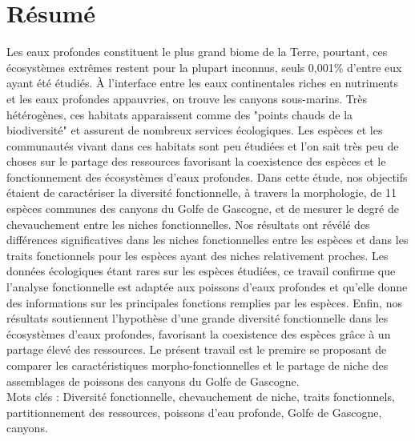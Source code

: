 \section{Résumé}
Les eaux profondes constituent le plus grand biome de la Terre, pourtant, ces écosystèmes extrêmes restent pour la plupart inconnus, seuls 0,001\% d'entre eux ayant été étudiés. À l'interface entre les eaux continentales riches en nutriments et les eaux profondes appauvries, on trouve les canyons sous-marins. Très hétérogènes, ces habitats apparaissent comme des "points chauds de la biodiversité" et assurent de nombreux services écologiques. Les espèces et les communautés vivant dans ces habitats sont peu étudiées et l'on sait très peu de choses sur le partage des ressources favorisant la coexistence des espèces et le fonctionnement des écosystèmes d'eaux profondes. Dans cette étude, nos objectifs étaient de caractériser la diversité fonctionnelle, à travers la morphologie, de 11 espèces communes des canyons du Golfe de Gascogne, et de mesurer le degré de chevauchement entre les niches fonctionnelles. Nos résultats ont révélé des différences significatives dans les niches fonctionnelles entre les espèces et dans les traits fonctionnels pour les espèces ayant des niches relativement proches. Les données écologiques étant rares sur les espèces étudiées, ce travail confirme que l'analyse fonctionnelle est adaptée aux poissons d'eaux profondes et qu'elle donne des informations sur les principales fonctions remplies par les espèces. Enfin, nos résultats soutiennent l'hypothèse d'une grande diversité fonctionnelle dans les écosystèmes d'eaux profondes, favorisant la coexistence des espèces grâce à un partage élevé des ressources. Le présent travail est le premire se proposant de comparer les caractéristiques morpho-fonctionnelles et le partage de niche des assemblages de poissons des canyons du Golfe de Gascogne.\\

Mots clés : Diversité fonctionnelle, chevauchement de niche, traits fonctionnels, partitionnement des ressources, poissons d'eau profonde, Golfe de Gascogne, canyons.